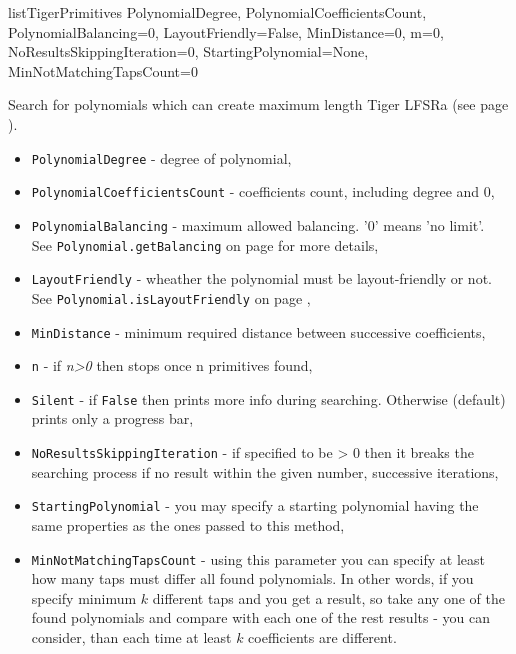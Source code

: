  {listTigerPrimitives} {PolynomialDegree, PolynomialCoefficientsCount,\\PolynomialBalancing=0, LayoutFriendly=False, MinDistance=0, m=0,\\NoResultsSkippingIteration=0, StartingPolynomial=None, MinNotMatchingTapsCount=0} {
	Search for polynomials which can create maximum length Tiger LFSRa (see page \pageref{lfsr:tiger}).
	\begin{itemize}
		\item \texttt{PolynomialDegree} - degree of polynomial,
		\item \texttt{PolynomialCoefficientsCount} - coefficients count, including degree and 0,
		\item \texttt{PolynomialBalancing} - maximum allowed balancing. '0' means 'no limit'. \\See \texttt{Polynomial.getBalancing} on page \pageref{polynomial:getbalancing} for more details,
		\item \texttt{LayoutFriendly} - wheather the polynomial must be layout-friendly or not. \\See \texttt{Polynomial.isLayoutFriendly} on page \pageref{polynomial:islayoutfriendly},
		\item \texttt{MinDistance} - minimum required distance between successive coefficients,
		\item \texttt{n} - if \textit{n>0} then stops once n primitives found,
		\item \texttt{Silent} - if \texttt{False} then prints more info during searching. Otherwise (default) prints only a progress bar,
		\item \texttt{NoResultsSkippingIteration} - if specified to be > 0 then it breaks the searching process if no result within the given number, successive iterations,
		\item \texttt{StartingPolynomial} - you may specify a starting polynomial having the same properties as the ones passed to this method,
		\item \texttt{MinNotMatchingTapsCount} - using this parameter you can specify at least how many taps must differ all found polynomials. In other words, if you specify minimum $k$ different taps and you get a result, so take any one of the found polynomials and compare with each one of the rest results - you can consider, than each time at least $k$ coefficients are different.
	\end{itemize}
}